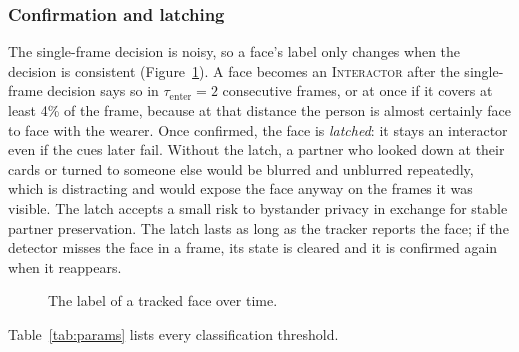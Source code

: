 \subsubsection{Confirmation and latching}

The single-frame decision is noisy, so a face's label only changes when the decision is
consistent (Figure~\ref{fig:state}). A face becomes an \textsc{Interactor} after the
single-frame decision says so in $\tau_{\mathrm{enter}} = 2$ consecutive frames, or at once
if it covers at least 4\% of the frame, because at that distance the person is almost
certainly face to face with the wearer. Once confirmed, the face is \emph{latched}: it
stays an interactor even if the cues later fail. Without the latch, a partner who looked
down at their cards or turned to someone else would be blurred and unblurred repeatedly,
which is distracting and would expose the face anyway on the frames it was visible. The
latch accepts a small risk to bystander privacy in exchange for stable partner
preservation. The latch lasts as long as the tracker reports the face; if the detector
misses the face in a frame, its state is cleared and it is confirmed again when it
reappears.

\begin{figure}[htbp]
\centering
{}
\caption{The label of a tracked face over time.}
\label{fig:state}
\end{figure}

Table~\ref{tab:params} lists every classification threshold.

